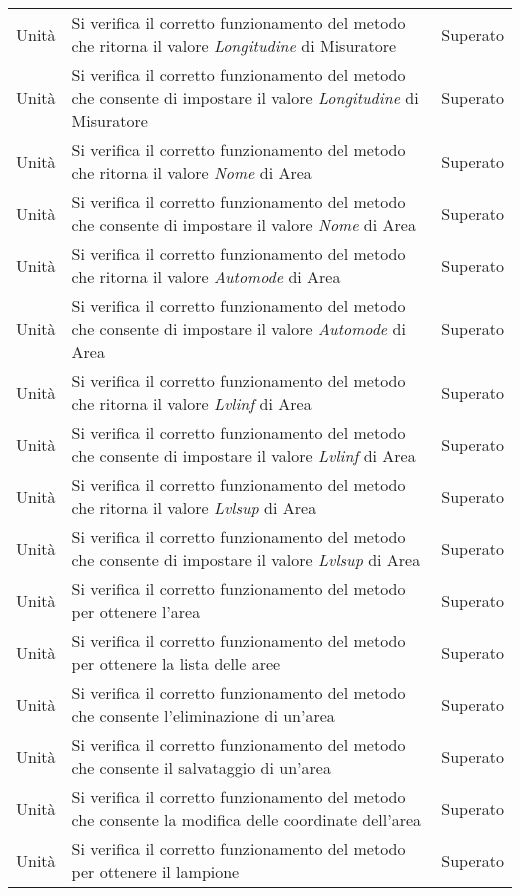 \begin{center}
\begin{xltabular}{\linewidth}{|l|X|l|}
        Unità & Si verifica il corretto funzionamento del metodo che ritorna il valore \textit{Longitudine} di Misuratore & Superato\\
        Unità & Si verifica il corretto funzionamento del metodo che consente di impostare il valore \textit{Longitudine} di Misuratore & Superato\\
        Unità & Si verifica il corretto funzionamento del metodo che ritorna il valore \textit{Nome} di Area & Superato\\
        Unità & Si verifica il corretto funzionamento del metodo che consente di impostare il valore \textit{Nome} di Area & Superato\\
        Unità & Si verifica il corretto funzionamento del metodo che ritorna il valore \textit{Automode} di Area & Superato\\
        Unità & Si verifica il corretto funzionamento del metodo che consente di impostare il valore \textit{Automode} di Area & Superato\\
        Unità & Si verifica il corretto funzionamento del metodo che ritorna il valore \textit{Lvlinf} di Area & Superato\\
        Unità & Si verifica il corretto funzionamento del metodo che consente di impostare il valore \textit{Lvlinf} di Area & Superato\\
        Unità & Si verifica il corretto funzionamento del metodo che ritorna il valore \textit{Lvlsup} di Area & Superato\\
        Unità & Si verifica il corretto funzionamento del metodo che consente di impostare il valore \textit{Lvlsup} di Area & Superato\\
        Unità & Si verifica il corretto funzionamento del metodo per ottenere l'area & Superato\\
        Unità & Si verifica il corretto funzionamento del metodo per ottenere la lista delle aree & Superato\\
        Unità & Si verifica il corretto funzionamento del metodo che consente l'eliminazione di un'area & Superato\\
        Unità & Si verifica il corretto funzionamento del metodo che consente il salvataggio di un'area & Superato\\
        Unità & Si verifica il corretto funzionamento del metodo che consente la modifica delle coordinate dell'area & Superato\\
        Unità & Si verifica il corretto funzionamento del metodo per ottenere il lampione & Superato\\

\end{xltabular}
\end{center}
